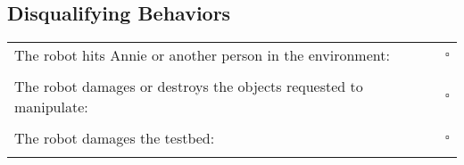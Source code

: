 \subsection*{Disqualifying Behaviors}
\begin{tabular}{ l c}

The robot hits Annie or another person in the environment: & $\square$ \\ \\

The robot damages or destroys the objects requested to manipulate: & $\square$ \\ \\

The robot damages the testbed: & $\square$ \\ \\

\end{tabular}


